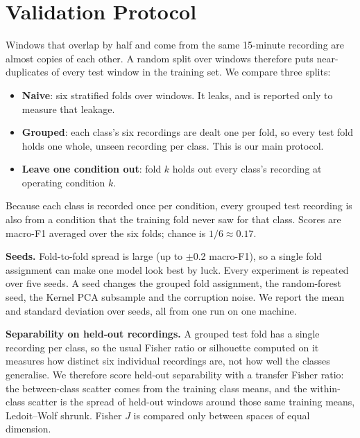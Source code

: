 
\section{Validation Protocol}\label{sec:validation}

Windows that overlap by half and come from the same 15-minute recording are almost copies of
each other. A random split over windows therefore puts near-duplicates of every test window in
the training set. We compare three splits:
\begin{itemize}
  \item \textbf{Naive}: six stratified folds over windows. It leaks, and is reported only to
        measure that leakage.
  \item \textbf{Grouped}: each class's six recordings are dealt one per fold, so every test fold
        holds one whole, unseen recording per class. This is our main protocol.
  \item \textbf{Leave one condition out}: fold $k$ holds out every class's recording at
        operating condition $k$.
\end{itemize}
Because each class is recorded once per condition, every grouped test recording is also from a
condition that the training fold never saw for that class. Scores are macro-F1 averaged over the
six folds; chance is $1/6 \approx 0.17$.

\textbf{Seeds.} Fold-to-fold spread is large (up to $\pm$0.2 macro-F1), so a single fold
assignment can make one model look best by luck. Every experiment is repeated over five seeds.
A seed changes the grouped fold assignment, the random-forest seed, the Kernel PCA subsample and
the corruption noise. We report the mean and standard deviation over seeds, all from one run on
one machine.

\textbf{Separability on held-out recordings.} A grouped test fold has a single recording per
class, so the usual Fisher ratio or silhouette computed on it measures how distinct six
individual recordings are, not how well the classes generalise. We therefore score held-out
separability with a transfer Fisher ratio: the between-class scatter comes from the training
class means, and the within-class scatter is the spread of held-out windows around those same
training means, Ledoit--Wolf shrunk. Fisher $J$ is compared only between spaces of equal
dimension.


